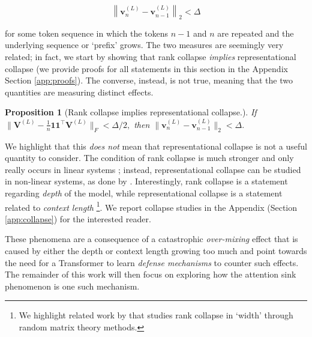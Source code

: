\documentclass{article} %
\newtheorem{proposition}[theorem]{Proposition}
\newcommand{\Vb}{\mathbf{V}}
\begin{document}
\begin{equation}
    \left \lVert \mathbf{v}_{n}^{(L)} - \mathbf{v}_{n-1}^{(L)} \right \rVert_2 < \Delta
\end{equation}

for some token sequence in which the tokens $n-1$ and $n$ are repeated and the underlying sequence or `prefix' grows. The two measures are seemingly very related; in fact, we start by showing that rank collapse \emph{implies} representational collapse (we provide proofs for all statements in this section in the Appendix Section \ref{app:proofs}). The converse, instead, is not true, meaning that the two quantities are measuring distinct effects.

\begin{proposition}[Rank collapse implies representational collapse.]
If $\|\Vb^{(L)} - \frac{1}{n}\mathbf{1}\mathbf{1}^\top\Vb^{(L)}\|_F < \Delta / 2,$ then $\|\mathbf{v}_n^{(L)} - \mathbf{v}_{n-1}^{(L)}\|_2 < \Delta.$

\end{proposition}

We highlight that this \emph{does not} mean that representational collapse is not a useful quantity to consider. The condition of rank collapse is much stronger and only really occurs in linear systems \cite{wu2024role, dong2021attention}; instead, representational collapse can be studied in non-linear systems, as done by \cite{barbero2024transformers}. Interestingly, rank collapse is a statement regarding \emph{depth} of the model, while representational collapse is a statement related to \emph{context length} \footnote{We highlight related work by \cite{naderi2024mind} that studies rank collapse in `width' through random matrix theory methods.}. We report collapse studies in the Appendix (Section \ref{app:collapse}) for the interested reader.

These phenomena are a consequence of a catastrophic \emph{over-mixing} effect that is caused by either the depth or context length growing too much and point towards the need for a Transformer to learn \emph{defense mechanisms} to counter such effects. The remainder of this work will then focus on exploring how the attention sink phenomenon is one such mechanism.
\end{document}
